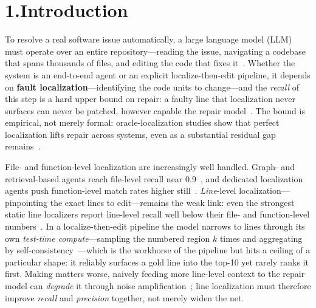 \documentclass[11pt]{article}
\begin{document}
\begin{abstract}
all of it: execution coverage is a \emph{membership} (control-flow) signal, whereas SWE-bench faults appear predominantly \emph{data-level} (6 of 9 where directly measurable; a patch-structure proxy extrapolates a $\sim$66\% majority dataset-wide---indicative), so neither the model's self-consistency nor external coverage can rank the buggy line among its executed neighbours. Not every external signal helps an LLM equally: a signal that only certifies reachability cannot break a discrimination ceiling. (Richer execution signals such as mutation or value tracing, which could reach data-level faults, are out of scope.)
\end{abstract}

\section*{1.\quad Introduction}

To resolve a real software issue automatically, a large language model (LLM) must operate over an entire repository---reading the issue, navigating a codebase that spans thousands of files, and editing the code that fixes it~\citep{swebench,sweagent,agentless}. Whether the system is an end-to-end agent or an explicit localize-then-edit pipeline, it depends on \textbf{fault localization}---identifying the code units to change---and the \emph{recall} of this step is a hard upper bound on repair: a faulty line that localization never surfaces can never be patched, however capable the repair model~\citep{liu_cannotfix}. The bound is empirical, not merely formal: oracle-localization studies show that perfect localization lifts repair across systems, even as a substantial residual gap remains~\citep{beyondloc}.

File- and function-level localization are increasingly well handled. Graph- and retrieval-based agents reach file-level recall near 0.9~\citep{locagent,agentless}, and dedicated localization agents push function-level match rates higher still~\citep{orcaloca,cosil}. \emph{Line}-level localization---pinpointing the exact lines to edit---remains the weak link: even the strongest static line localizers report line-level recall well below their file- and function-level numbers~\citep{arise}. In a localize-then-edit pipeline the model narrows to lines through its own \emph{test-time compute}---sampling the numbered region $k$ times and aggregating by self-consistency~\citep{self_consistency,test_time_compute}---which is the workhorse of the pipeline but hits a ceiling of a particular shape: it reliably surfaces a gold line into the top-10 yet rarely ranks it first. Making matters worse, naively feeding more line-level context to the repair model can \emph{degrade} it through noise amplification~\citep{flcontext}; line localization must therefore improve \emph{recall} and \emph{precision} together, not merely widen the net.
\end{document}
